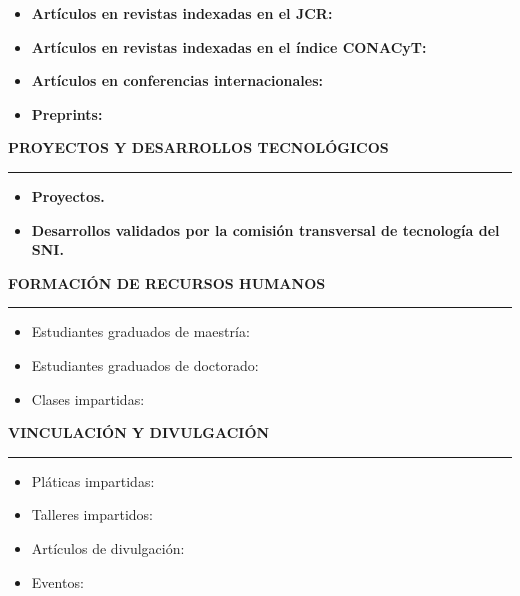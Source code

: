 \documentclass[10pt]{article}
\begin{document}

\begin{itemize}
	\item \textbf{Artículos en revistas indexadas en el JCR:}
	
	
	\item \textbf{Artículos en revistas indexadas en el índice CONACyT:}
	
	
	\item \textbf{Artículos en conferencias internacionales:}
	
	
	\item \textbf{Preprints:}
	
\end{itemize} 

\vspace{0.3cm}
\textbf{PROYECTOS Y DESARROLLOS TECNOLÓGICOS}
\vspace{3pt}
\hrule
\begin{itemize}
	\item \textbf{Proyectos.}
	
	\item \textbf{Desarrollos validados por la comisión transversal de tecnología del SNI.}
	
\end{itemize}


\vspace{0.3cm}
{\bf FORMACIÓN DE RECURSOS HUMANOS}
\vspace{3pt}
\hrule

\begin{itemize}
	\item Estudiantes graduados de maestría:
	

	\item Estudiantes graduados de doctorado:
	
	
	\item Clases impartidas:
	
\end{itemize}


\vspace{0.3cm}
\textbf{VINCULACIÓN Y DIVULGACIÓN}
\vspace{3pt}
\hrule

\begin{itemize}
	\item Pláticas impartidas:
	
	
	\item Talleres impartidos:
	
	
	\item Artículos de divulgación:
	
	
	\item Eventos:
	
\end{itemize}
\end{document}
